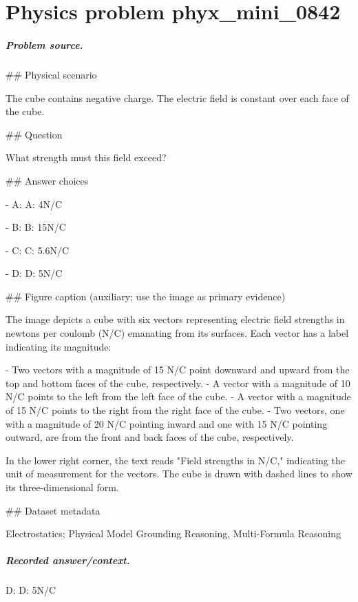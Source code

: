 
\chapter{Physics problem phyx\_mini\_0842}
\label{ch:PhyXMiniProblems_problem_phyx_mini_0842}

\paragraph{Problem source.}
\#\# Physical scenario

The cube contains negative charge. The electric field is constant over each face of the cube.

\#\# Question

What strength must this field exceed?

\#\# Answer choices

- A: A: 4N/C

- B: B: 15N/C

- C: C: 5.6N/C

- D: D: 5N/C

\#\# Figure caption (auxiliary; use the image as primary evidence)

The image depicts a cube with six vectors representing electric field strengths in newtons per coulomb (N/C) emanating from its surfaces. Each vector has a label indicating its magnitude:

- Two vectors with a magnitude of 15 N/C point downward and upward from the top and bottom faces of the cube, respectively.
- A vector with a magnitude of 10 N/C points to the left from the left face of the cube.
- A vector with a magnitude of 15 N/C points to the right from the right face of the cube.
- Two vectors, one with a magnitude of 20 N/C pointing inward and one with 15 N/C pointing outward, are from the front and back faces of the cube, respectively.

In the lower right corner, the text reads "Field strengths in N/C," indicating the unit of measurement for the vectors. The cube is drawn with dashed lines to show its three-dimensional form.

\#\# Dataset metadata

Electrostatics; Physical Model Grounding Reasoning, Multi-Formula Reasoning

\paragraph{Recorded answer/context.}
D: D: 5N/C

